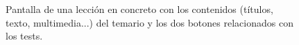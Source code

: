 \begin{figure}[H]%
  \centering
  \qquad
  \caption{Pantalla de una lección en concreto con los contenidos (títulos, texto, multimedia...) del temario y los dos botones relacionados con los tests.}%
  \label{fig:example}%
\end{figure}

